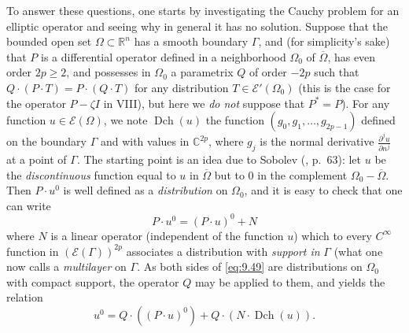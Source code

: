 \documentclass[12pt,a4paper,leqno,twoside]{extbook}
\newcommand{\C}{\mathbb{C}}
\newcommand{\R}{\mathbb{R}}
\newcommand{\Dch}{\operatorname{Dch}}
\newcommand{\pder}[2]{\frac{\partial #1}{\partial #2}}
\begin{document}
To answer these questions, one starts by investigating the Cauchy problem for an elliptic operator and seeing why in general it has no solution. Suppose that the bounded open set \(\Omega \subset \R^n\) has a smooth boundary \(\Gamma\), and (for simplicity's sake) that \(P\) is a differential operator defined in a neighborhood \(\Omega_0\) of \(\overline{\Omega}\), has even order \(2p \geq 2\), and possesses in \(\Omega_0\) a parametrix \(Q\) of order \(-2p\) such that \(Q \cdot (P \cdot T) = P \cdot (Q \cdot T)\) for any distribution \(T \in \mathcal{E}'(\Omega_0)\) (this is the case for the operator \(P - \zeta I\) in VIII), but here we \emph{do not} suppose that \(P^* = P\)). For any function \(u \in \mathcal{E}(\Omega)\), we note \(\Dch(u)\) the function \((g_0, g_1, \ldots, g_{2p-1})\) defined on the boundary \(\Gamma\) and with values in \(\C^{2p}\), where \(g_j\) is the normal derivative \(\pder{^j u}{n^j}\) at a point of \(\Gamma\). The starting point is an idea due to Sobolev (\cite{200}, p.~63): let \(u\) be the \emph{discontinuous} function equal to \(u\) in \(\overline{\Omega}\) but to 0 in the complement \(\Omega_0 - \overline{\Omega}\). Then \(P \cdot u^0\) is well defined as a \emph{distribution} on \(\Omega_0\), and it is easy to check that one can write
\begin{equation}
    \label{eq:9.49}
    P \cdot u^0 = (P \cdot u)^0 + N
\end{equation}
where \(N\) is a linear operator (independent of the function \(u\)) which to every \(C^\infty\) function in \((\mathcal{E}(\Gamma))^{2p}\) associates a distribution with \emph{support in} \(\Gamma\) (what one now calls a \emph{multilayer} on \(\Gamma\). As both sides of \eqref{eq:9.49} are distributions on \(\Omega_0\) with compact support, the operator \(Q\) may be applied to them, and yields the relation
\begin{equation}
    \label{eq:9.50}
    u^0 = Q \cdot ((P \cdot u)^0) + Q \cdot (N \cdot \Dch(u)).
\end{equation}
\end{document}
